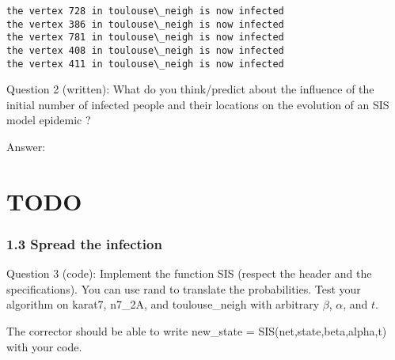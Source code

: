\documentclass[11pt]{article}
\begin{document}
    \begin{Verbatim}[commandchars=\\\{\}]
the vertex 728 in toulouse\_neigh is now infected 
the vertex 386 in toulouse\_neigh is now infected 
the vertex 781 in toulouse\_neigh is now infected 
the vertex 408 in toulouse\_neigh is now infected 
the vertex 411 in toulouse\_neigh is now infected 

    \end{Verbatim}

    Question 2 (written): What do you think/predict about the influence of
the initial number of infected people and their locations on the
evolution of an SIS model epidemic ?

Answer:

    \section{TODO}\label{todo}

    \subsubsection{1.3 Spread the infection}\label{spread-the-infection}

    Question 3 (code): Implement the function SIS (respect the header and
the specifications). You can use rand to translate the probabilities.
Test your algorithm on karat7, n7\_2A, and toulouse\_neigh with
arbitrary \(\beta\), \(\alpha\), and \(t\).

{The corrector should be able to write new\_state =
SIS(net,state,beta,alpha,t) with your code.}
\end{document}
